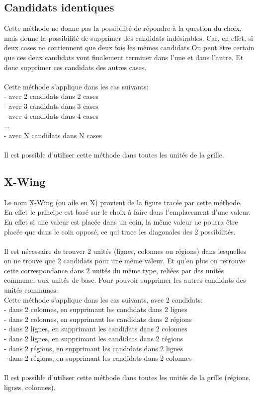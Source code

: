 \subsection{Candidats identiques}
Cette méthode ne donne pas la possibilité de répondre à la question du choix,
mais donne la possibilité de supprimer des candidats indésirables.
Car, en effet, si deux cases ne contiennent que deux fois les mêmes candidats
On peut être certain que ces deux candidats vont finalement terminer dans l'une
et dans l'autre. Et donc supprimer ces candidats des autres cases.\\
\\
Cette méthode s'applique dans les cas suivants:\\
- avec 2 candidats dans 2 cases\\
- avec 3 candidats dans 3 cases\\
- avec 4 candidats dans 4 cases\\
...\\
- avec N candidats dans N cases\\
\\
Il est possible d'utiliser cette méthode dans toutes les unités de la grille.

\subsection{X-Wing}
Le nom X-Wing (ou aile en X) provient de la figure tracée par cette méthode. \\
En effet le principe est basé sur le choix à faire dans l'emplacement d'une valeur. \\
En effet si une valeur est placée dans un coin, la même valeur ne pourra être placée que dans le coin opposé, 
ce qui trace les diagonales des 2 possibilités.\\
\\
Il est nécessaire de trouver 2 unités (lignes, colonnes ou régions) dans lesquelles on ne trouve que 2 candidats pour une même valeur. Et qu'en plus on retrouve cette correspondance dans 2 unités du même type, reliées par des unités communes aux unités de base. Pour pouvoir supprimer les autres candidats des unités communes.
\\
Cette méthode s'applique dans les cas suivants, avec 2 candidats:\\
- dans 2 colonnes, en supprimant les candidats dans 2 lignes\\
- dans 2 colonnes, en supprimant les candidats dans 2 régions\\
- dans 2 lignes, en supprimant les candidats dans 2 colonnes\\
- dans 2 lignes, en supprimant les candidats dans 2 régions\\
- dans 2 régions, en supprimant les candidats dans 2 lignes\\
- dans 2 régions, en supprimant les candidats dans 2 colonnes\\
\\
Il est possible d'utiliser cette méthode dans toutes les unités de la grille (régions, lignes, colonnes).
\\

